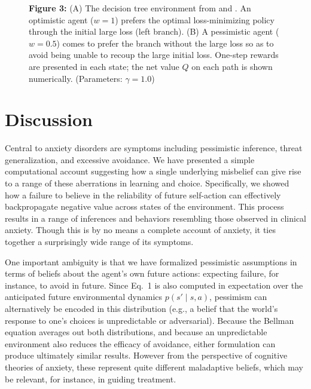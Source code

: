 \documentclass[11pt]{article} %
\begin{document}
\begin{figure}[!b]
  \centerline{%
  }
  \par \textbf{Figure 3:} (A) The decision tree environment from \cite{Huys2012} and \cite{Lally2017}. An optimistic agent ($w=1$) prefers the optimal loss-minimizing policy through the initial large loss (left branch). (B) A pessimistic agent ($w=0.5$) comes to prefer the branch without the large loss so as to avoid being unable to recoup the large initial loss. One-step rewards are presented in each state; the net value $Q$ on each path is shown numerically. (Parameters: $\gamma = 1.0$)
\end{figure}

\section{Discussion}

Central to anxiety disorders are symptoms including pessimistic inference, threat generalization, and excessive avoidance. We have presented a simple computational account suggesting how a single underlying misbelief can give rise to a range of these aberrations in learning and choice. Specifically, we showed how a failure to believe in the reliability of future self-action can effectively backpropagate negative value across states of the environment. This process results in a range of inferences and behaviors resembling those observed in clinical anxiety. Though this is by no means a complete account of anxiety, it ties together a surprisingly wide range of its symptoms.

One important ambiguity is that we have formalized pessimistic assumptions in terms of beliefs about the agent's own future actions: expecting failure, for instance, to avoid in future. Since Eq.~1 is also computed in expectation over the anticipated future environmental dynamics $p(s' \mid s,a)$, pessimism can alternatively be encoded in this distribution (e.g., a belief that the world's response to one's choices is unpredictable or adversarial). Because the Bellman equation averages out both distributions,  and because an unpredictable environment also reduces the efficacy of avoidance, either formulation can produce ultimately similar results. However from the perspective of cognitive theories of anxiety, these represent quite different maladaptive beliefs, which may be relevant, for instance, in guiding treatment.
\end{document}
